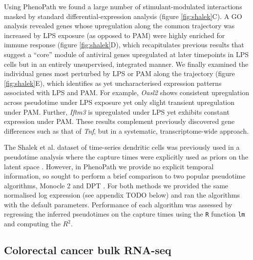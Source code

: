 Using PhenoPath we found a large number of stimulant-modulated interactions masked by standard differential-expression analysis (figure \ref{fig:shalek}C). A GO analysis revealed genes whose upregulation along the common trajectory was increased by LPS exposure (as opposed to PAM) were highly enriched for immune response (figure \ref{fig:shalek}D), which recapitulates previous results\cite{Shalek2014-cg,Reid2016-yo} that suggest a ``core'' module of antiviral genes upregulated at later timepoints in LPS cells but in an entirely unsupervised, integrated manner. We finally examined the individual genes most perturbed by LPS or PAM along the trajectory (figure \ref{fig:shalek}E), which identifies as yet uncharacterised expression patterns associated with LPS and PAM. For example, \emph{Oasl2} shows consistent upregulation across pseudotime under LPS exposure yet only slight transient upregulation under PAM. Further, \emph{Iftm3} is upregulated under LPS yet exhibits constant expression under PAM. These results complement previously discovered gene differences such as that of \emph{Tnf}, but in a systematic, transcriptome-wide approach.

The Shalek et al. dataset of time-series dendritic cells was previously used in a pseudotime analysis where the capture times were explicitly used as priors on the latent space \cite{Reid2016-yo}. However, in PhenoPath we provide no explicit temporal information, so sought to perform a brief comparison to two popular pseudotime algorithms, Monocle 2 \cite{Qiu2017-eu} and DPT \cite{Haghverdi2016-eg}. For both methods we provided the same normalised log expression (see appendix TODO below) and ran the algorithms with the default parameters. Performance of each algorithm was assessed by regressing the inferred pseudotimes on the capture times using the \texttt{R} function \texttt{lm} and computing the $R^2$.


\subsection{Colorectal cancer bulk RNA-seq} \label{sec:coad}

